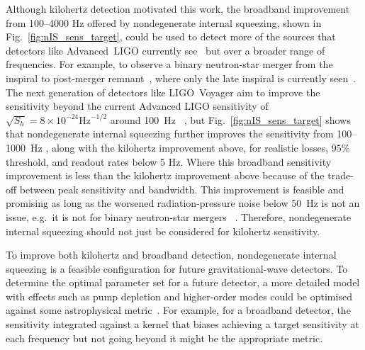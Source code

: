 Although kilohertz detection motivated this work, the broadband improvement from 100--4000 Hz offered by nondegenerate internal squeezing, shown in Fig.~\ref{fig:nIS_sens_target}, could be used to detect more of the sources that detectors like Advanced~LIGO currently see~\cite{} but over a broader range of frequencies. For example, to observe a binary neutron-star merger from the inspiral to post-merger remnant~\cite{}, where only the late inspiral is currently seen~\cite{}.  The next generation of detectors like LIGO~Voyager aim to improve the sensitivity beyond the current Advanced LIGO sensitivity of $\sqrt{S_h}=8\times10^{-24}\text{Hz}^{-1/2}$ around 100~Hz~\cite{PhysRevD.93.112004} , but Fig.~\ref{fig:nIS_sens_target} shows that nondegenerate internal squeezing further improves the sensitivity from 100--1000~Hz , along with the kilohertz improvement above, for realistic losses, $95\%$ threshold, and readout rates below 5 Hz. Where this broadband sensitivity improvement is less than the kilohertz improvement above  because of the trade-off between peak sensitivity and bandwidth. This improvement is feasible and promising as long as the worsened radiation-pressure noise below 50~Hz is not an issue, e.g.\ it is not for binary neutron-star mergers~\cite{} . Therefore, nondegenerate internal squeezing should not just be considered for kilohertz sensitivity.


To improve both kilohertz and broadband detection, nondegenerate internal squeezing is a feasible configuration for future gravitational-wave detectors. To determine the optimal parameter set for a future detector, a more detailed model with effects such as pump depletion and higher-order modes  could be optimised against some astrophysical metric~\cite{}. For example, for a broadband detector, the sensitivity integrated against a kernel that biases achieving a target sensitivity at each frequency but not going beyond it might be the appropriate metric. 



